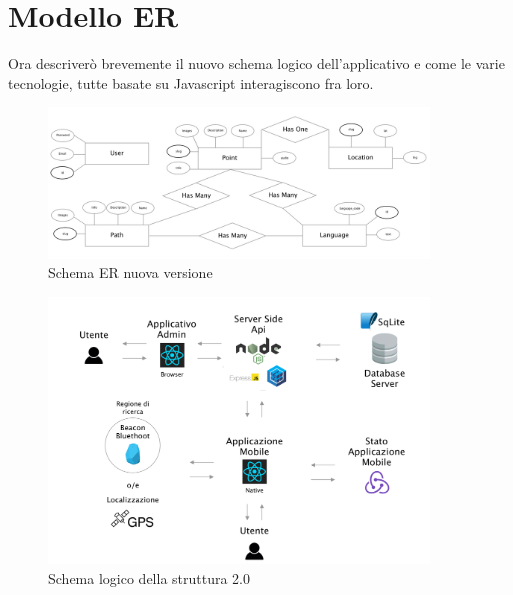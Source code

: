 \section{Modello ER}\vspace{5mm}

Ora descriverò brevemente il nuovo schema logico dell'applicativo e come le varie tecnologie, tutte basate su Javascript interagiscono fra loro.
	
\begin{figure}[h]
\centering
\includegraphics[width=0.9\textwidth]{images/erNew.png}
\caption{Schema ER nuova versione}
\end{figure}
	
	
\begin{figure}[h]
\centering
\includegraphics[width=0.9\textwidth]{images/stackAlakai.png}
\caption{Schema logico della struttura 2.0}
\end{figure}

